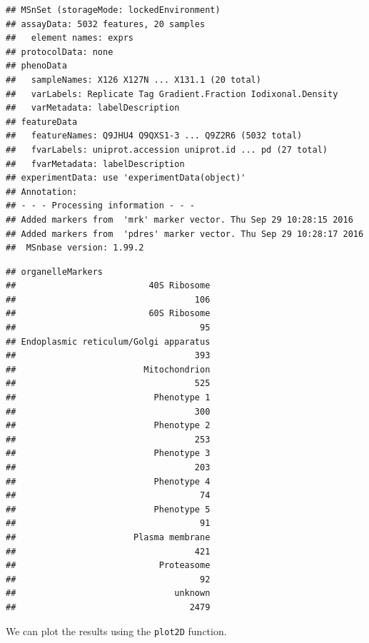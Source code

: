 \begin{verbatim}
## MSnSet (storageMode: lockedEnvironment)
## assayData: 5032 features, 20 samples 
##   element names: exprs 
## protocolData: none
## phenoData
##   sampleNames: X126 X127N ... X131.1 (20 total)
##   varLabels: Replicate Tag Gradient.Fraction Iodixonal.Density
##   varMetadata: labelDescription
## featureData
##   featureNames: Q9JHU4 Q9QXS1-3 ... Q9Z2R6 (5032 total)
##   fvarLabels: uniprot.accession uniprot.id ... pd (27 total)
##   fvarMetadata: labelDescription
## experimentData: use 'experimentData(object)'
## Annotation:  
## - - - Processing information - - -
## Added markers from  'mrk' marker vector. Thu Sep 29 10:28:15 2016 
## Added markers from  'pdres' marker vector. Thu Sep 29 10:28:17 2016 
##  MSnbase version: 1.99.2
\end{verbatim}

\begin{Shaded}
\begin{Highlighting}[]
 \NormalTok{)}
\end{Highlighting}
\end{Shaded}

\begin{verbatim}
## organelleMarkers
##                          40S Ribosome 
##                                   106 
##                          60S Ribosome 
##                                    95 
## Endoplasmic reticulum/Golgi apparatus 
##                                   393 
##                         Mitochondrion 
##                                   525 
##                           Phenotype 1 
##                                   300 
##                           Phenotype 2 
##                                   253 
##                           Phenotype 3 
##                                   203 
##                           Phenotype 4 
##                                    74 
##                           Phenotype 5 
##                                    91 
##                       Plasma membrane 
##                                   421 
##                            Proteasome 
##                                    92 
##                               unknown 
##                                  2479
\end{verbatim}

We can plot the results using the \texttt{plot2D} function.


